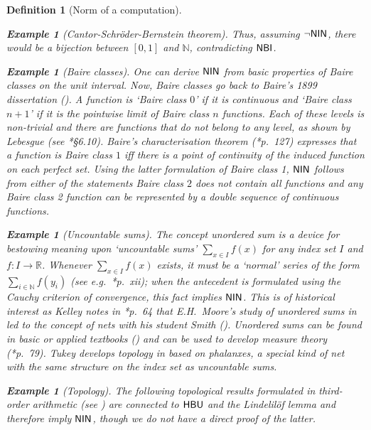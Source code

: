 \documentclass[reqno]{amsart}
\newtheorem{defi}[thm]{Definition}
\newtheorem{exa}[thm]{Example}
\def\N{{\mathbb  N}}
\def\R{{\mathbb  R}}
\def\di{\rightarrow}
\def\HBU{\textup{\textsf{HBU}}}
\def\NBI{\textup{\textsf{NBI}}}
\def\NIN{\textup{\textsf{NIN}}}
\def\BOOT{\textup{\textsf{BOOT}}}
\numberwithin{equation}{section}
\numberwithin{thm}{section}
\begin{document}
\begin{defi}[Norm of a computation]
\begin{exa}[Cantor-Schr\"oder-Bernstein theorem]
Thus, assuming $\neg \NIN$, there would be a bijection between $[0,1]$ and $\N$, contradicting $\NBI$.
\end{exa}
\begin{exa}[Baire classes]\rm
One can derive $\NIN$ from basic properties of \emph{Baire classes} on the unit interval.
Now, \emph{Baire classes} go back to Baire's 1899 dissertation (\cite{beren}).
A function is `Baire class $0$' if it is continuous and `Baire class $n+1$' if it is the pointwise limit of Baire class $n$ functions.  
Each of these levels is non-trivial and there are functions that do not belong to any level, as shown by Lebesgue (see \cite{kleine}*{\S6.10}). 
Baire's \emph{characterisation theorem} (\cite{beren}*{p.\ 127}) expresses that a function is Baire class $1$ iff there is a point of continuity of the induced function on each perfect set.
Using the latter formulation of Baire class 1, $\NIN$ follows from either of the statements \emph{Baire class $2$ does not contain all functions} and \emph{any Baire class 2 function can be represented by a double sequence of continuous functions}.  
\end{exa}
\begin{exa}[Uncountable sums]\rm
The concept \emph{unordered sum} is a device for bestowing meaning upon `uncountable sums' $\sum_{x\in I}f(x)$ for any index set $I$ and $f:I\di \R$.  
Whenever $\sum_{x\in I}f(x)$ exists, it must be a `normal' series of the form $\sum_{i\in \N}f(y_{i})$ (see e.g.\ \cite{taomes}*{p.\ xii}); when the antecedent is formulated using the Cauchy criterion of convergence, this fact implies $\NIN$.
This is of historical interest as Kelley notes in \cite{ooskelly}*{p.\ 64} that E.H.\ Moore's study of unordered sums in \cite{moorelimit2} led to the concept of nets with his student Smith (\cite{moorsmidje}).
Unordered sums can be found in basic or applied textbooks (\cites{hunterapp,sohrab, taomes}) and can be used to develop measure theory (\cite{ooskelly}*{p.\ 79}).  
Tukey develops topology in \cite{tukey1} based on \emph{phalanxes}, a special kind of net with the same structure on the index set as uncountable sums.  
\end{exa}
\begin{exa}[Topology]\rm
The following topological results formulated in third-order arithmetic (see \cite{sahotop}) are connected to $\HBU$ and the Lindelil\"of lemma and therefore imply $\NIN$, though we do not have a direct proof of the latter.  

\end{exa}
\end{defi}
\end{document}
